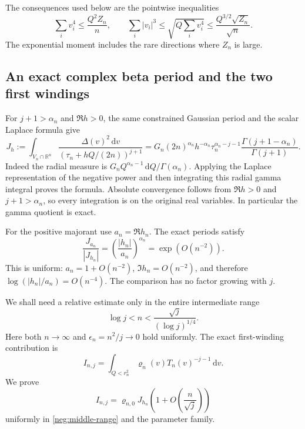 \documentclass[11pt]{article}
\numberwithin{equation}{section}
\theoremstyle{definition}
\newcommand{\dd}{\,\mathrm d}
\begin{document}
The consequences used below are the pointwise inequalities
\begin{equation}
 \sum_i v_i^4\le\frac{Q^2Z_n}{n},\qquad
 \sum_i|v_i|^3\le\sqrt{Q\sum_i v_i^4}
             \le\frac{Q^{3/2}\sqrt{Z_n}}{\sqrt n}.
 \label{neg:angular-power-bounds}
\end{equation}
The exponential moment includes the rare directions where
\(Z_n\) is large.

\subsection{An exact complex beta period and the two first windings}
\label{neg:beta-evaluation}

For \(j+1>\alpha_n\) and \(\Re h>0\), the same constrained
Gaussian period and the scalar Laplace formula give
\begin{equation}
 J_h:=\int_{V_n\cap\mathbb R^n}
       \frac{\Delta(v)^2\dd v}{(\tau_n+hQ/(2n))^{j+1}}
 =G_n(2n)^{\alpha_n}h^{-\alpha_n}
     \tau_n^{\alpha_n-j-1}
       \frac{\Gamma(j+1-\alpha_n)}{\Gamma(j+1)}.
 \label{neg:first-beta}
\end{equation}
Indeed the radial measure is
\(G_nQ^{\alpha_n-1}\dd Q/\Gamma(\alpha_n)\).  Applying the
Laplace representation of the negative power and then integrating
this radial gamma integral proves the formula.  Absolute convergence
follows from \(\Re h>0\) and \(j+1>\alpha_n\), so every integration
is on the original real variables.  In particular the gamma quotient
is exact.

For the positive majorant use \(a_n=\Re h_n\).  The exact periods
satisfy
\begin{equation}
 \frac{J_{a_n}}{|J_{h_n}|}
 =\left(\frac{|h_n|}{a_n}\right)^{\alpha_n}
 =\exp(O(n^{-2})).
 \label{neg:complex-beta-cost}
\end{equation}
This is uniform: \(a_n=1+O(n^{-2})\),
\(\Im h_n=O(n^{-2})\), and therefore
\(\log(|h_n|/a_n)=O(n^{-4})\).  The comparison has no factor
growing with \(j\).

We shall need a relative estimate only in the entire intermediate
range
\begin{equation}
 \log j<n<\frac{\sqrt j}{(\log j)^{1/4}}.
 \label{neg:middle-range}
\end{equation}
Here both \(n\to\infty\) and \(\epsilon_n=n^2/j\to0\) hold
uniformly.  The exact first-winding contribution is
\[
 I_{n,j}=\int_{Q<r_n^2}
       \varrho_n(v)T_n(v)^{-j-1}\dd v.
\]
We prove
\begin{equation}
 I_{n,j}=\varrho_{n,0}J_{h_n}
             \left(1+O\left(\frac n{\sqrt j}\right)\right)
 \label{neg:one-winding-model}
\end{equation}
uniformly in \eqref{neg:middle-range} and the parameter family.
\end{document}
